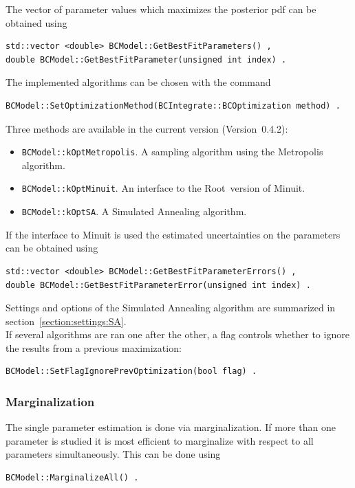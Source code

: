 \documentclass[11pt, a4paper]{article}
\newcommand{\Root}{{\sc Root}}
\newcommand{\versionno}{0.4.2}
\newcommand{\Version}{Version~\versionno}
\begin{document}
\noindent
The vector of parameter values which maximizes the posterior pdf can be obtained using
%
\begin{verbatim}
std::vector <double> BCModel::GetBestFitParameters() ,
double BCModel::GetBestFitParameter(unsigned int index) .
\end{verbatim}
%
The implemented algorithms can be chosen with the command
%
\begin{verbatim}
BCModel::SetOptimizationMethod(BCIntegrate::BCOptimization method) .
\end{verbatim}
%
Three methods are available in the current version (\Version):
%
\begin{itemize}
\item \verb|BCModel::kOptMetropolis|. A sampling algorithm using the
  Metropolis algorithm.
\item \verb|BCModel::kOptMinuit|. An interface to the \Root\ version
  of Minuit.
\item \verb|BCModel::kOptSA|. A Simulated Annealing algorithm.
\end{itemize}
%
If the interface to Minuit is used the estimated uncertainties on the
parameters can be obtained using
%
\begin{verbatim}
std::vector <double> BCModel::GetBestFitParameterErrors() ,
double BCModel::GetBestFitParameterError(unsigned int index) .
\end{verbatim}
%
Settings and options of the Simulated Annealing algorithm are
summarized in section~\ref{section:settings:SA}. \\

\noindent 
If several algorithms are ran one after the other, a flag controls
whether to ignore the results from a previous maximization:
%
\begin{verbatim}
BCModel::SetFlagIgnorePrevOptimization(bool flag) .
\end{verbatim}


\subsubsection{Marginalization}
\label{subsubsection:marginalization}

\noindent
The single parameter estimation is done via marginalization. If more
than one parameter is studied it is most efficient to marginalize with
respect to all parameters simultaneously. This can be done using
%
\begin{verbatim}
BCModel::MarginalizeAll() .
\end{verbatim}
\end{document}
